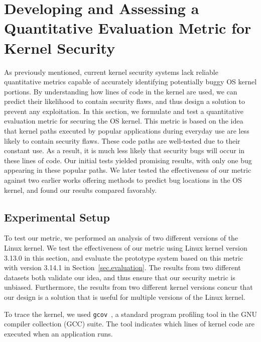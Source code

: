 \section{Developing and Assessing a Quantitative Evaluation Metric for Kernel Security}
\label{sec.metric}

As previously mentioned, current kernel
security systems lack reliable quantitative metrics capable of
 accurately identifying potentially buggy OS kernel portions. By understanding
how lines of code in the kernel are used, we can predict their likelihood to contain
 security flaws, and thus
design a solution to prevent any exploitation.
In this section, we formulate and test
a quantitative evaluation metric for securing the OS kernel.
This metric is based on the idea that kernel paths executed by popular applications
during everyday use are less likely to contain security flaws.
These code paths are well-tested due to their constant use. As a result,
it is much less likely that security bugs will occur in these lines of code.
Our initial tests yielded promising results, with only one
bug appearing in these popular paths.  We later tested the effectiveness
of our metric against two earlier works offering methods to predict bug
locations in the OS kernel, and found our results compared favorably.

\subsection{Experimental Setup}\label{sec-setup}
To test our metric, we performed an analysis of two different versions of
the Linux kernel.
We test the effectiveness of our metric using Linux kernel version 3.13.0 in this
section, and evaluate the prototype system based on this metric with version 3.14.1 in
Section~\ref{sec.evaluation}. The results from two different datasets both validate
our idea, and thus ensure that our security metric is unbiased. Furthermore,
the results from two different kernel versions concur that our design is
a solution that is useful for multiple versions of the Linux kernel.

To trace the kernel, we used \texttt{gcov}~\cite{gcov}, a standard program profiling
tool in the GNU compiler collection (GCC) suite. The tool indicates which lines of kernel
code are executed when an application runs.

